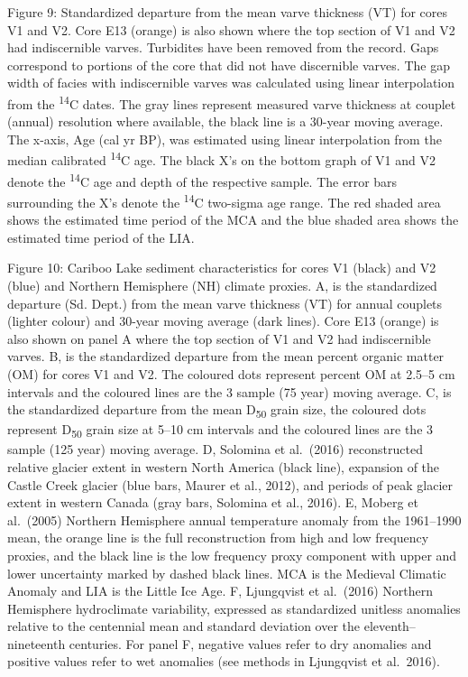 \documentclass[
  letterpaper,
  DIV=11,
  numbers=noendperiod]{scrartcl}
\begin{document}
Figure 9: Standardized departure from the mean varve thickness (VT) for
cores V1 and V2. Core E13 (orange) is also shown where the top section
of V1 and V2 had indiscernible varves. Turbidites have been removed from
the record. Gaps correspond to portions of the core that did not have
discernible varves. The gap width of facies with indiscernible varves
was calculated using linear interpolation from the \textsuperscript{14}C
dates. The gray lines represent measured varve thickness at couplet
(annual) resolution where available, the black line is a 30-year moving
average. The x-axis, Age (cal yr BP), was estimated using linear
interpolation from the median calibrated \textsuperscript{14}C age. The
black X's on the bottom graph of V1 and V2 denote the
\textsuperscript{14}C age and depth of the respective sample. The error
bars surrounding the X's denote the \textsuperscript{14}C two-sigma age
range. The red shaded area shows the estimated time period of the MCA
and the blue shaded area shows the estimated time period of the LIA.

Figure 10: Cariboo Lake sediment characteristics for cores V1 (black)
and V2 (blue) and Northern Hemisphere (NH) climate proxies. A, is the
standardized departure (Sd. Dept.) from the mean varve thickness (VT)
for annual couplets (lighter colour) and 30-year moving average (dark
lines). Core E13 (orange) is also shown on panel A where the top section
of V1 and V2 had indiscernible varves. B, is the standardized departure
from the mean percent organic matter (OM) for cores V1 and V2. The
coloured dots represent percent OM at 2.5--5 cm intervals and the
coloured lines are the 3 sample (75 year) moving average. C, is the
standardized departure from the mean D\textsubscript{50} grain size, the
coloured dots represent D\textsubscript{50} grain size at 5--10 cm
intervals and the coloured lines are the 3 sample (125 year) moving
average. D, Solomina et al.~(2016) reconstructed relative glacier extent
in western North America (black line), expansion of the Castle Creek
glacier (blue bars, Maurer et al., 2012), and periods of peak glacier
extent in western Canada (gray bars, Solomina et al., 2016). E, Moberg
et al.~(2005) Northern Hemisphere annual temperature anomaly from the
1961--1990 mean, the orange line is the full reconstruction from high
and low frequency proxies, and the black line is the low frequency proxy
component with upper and lower uncertainty marked by dashed black lines.
MCA is the Medieval Climatic Anomaly and LIA is the Little Ice Age. F,
Ljungqvist et al.~(2016) Northern Hemisphere hydroclimate variability,
expressed as standardized unitless anomalies relative to the centennial
mean and standard deviation over the eleventh--nineteenth centuries. For
panel F, negative values refer to dry anomalies and positive values
refer to wet anomalies (see methods in Ljungqvist et
al.~2016).\pagebreak
\end{document}
